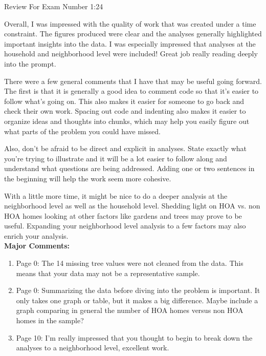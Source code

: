 \documentclass{article}
\begin{document}

\begin{center}
  {\LARGE Review For Exam Number 1:24}\\\vspace{1em}
\end{center}

Overall, I was impressed with the quality of work that was created under a time constraint. The figures produced were clear and the analyses generally highlighted important insights into the data. I was especially impressed that analyses at the household and neighborhood level were included! Great job really reading deeply into the prompt.
\newline

There were a few general comments that I have that may be useful going forward. The first is that it is generally a good idea to comment code so that it's easier to follow what's going on. This also makes it easier for someone to go back and check their own work. Spacing out code and indenting also makes it easier to organize ideas and thoughts into chunks, which may help you easily figure out what parts of the problem you could have missed.
\newline

Also, don't be afraid to be direct and explicit in analyses. State exactly what you're trying to illustrate and it will be a lot easier to follow along and understand what questions are being addressed. Adding one or two sentences in the beginning will help the work seem more cohesive.
\newline

With a little more time, it might be nice to do a deeper analysis at the neighborhood level as well as the household level. Shedding light on HOA vs. non HOA homes looking at other factors like gardens and trees may prove to be useful. Expanding your neighborhood level analysis to a few factors may also enrich your analysis. \\

\textbf{Major Comments:} 
\begin{enumerate}
  \item Page 0: The 14 missing tree values were not cleaned from the data. This means that your data may not be a representative sample.
  \item Page 0: Summarizing the data before diving into the problem is important. It only takes one graph or table, but it makes a big difference. Maybe include a graph comparing in general the number of HOA homes versus non HOA homes in the sample? 
  \item Page 10: I'm really impressed that you thought to begin to break down the analyses to a neighborhood level, excellent work. 
\end{enumerate}
\end{document}
